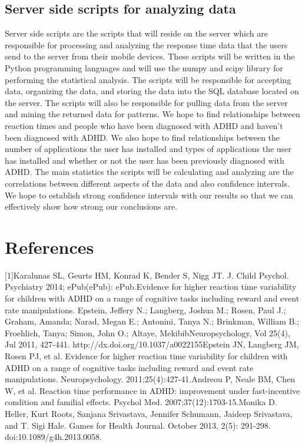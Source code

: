 \documentclass[a4wide]{article}
\begin{document}
\subsection{Server side scripts for analyzing data}
\- Server side scripts are the scripts that will reside on the server which are responsible for processing and analyzing the response time data that the users send to the server from their mobile devices. These scripts will be written in the Python programming languages and will use the numpy and scipy library for performing the statistical analysis. The scripts will be responsible for accepting data, organizing the data, and storing the data into the SQL database located on the server. The scripts will also be responsible for pulling data from the server and mining the returned data for patterns. We hope to find relationships between reaction times and people who have been diagnosed with ADHD and haven't been diagnosed with ADHD. We also hope to find relationships between the number of applications the user has installed and types of applications the user has installed and whether or not the user has been previously diagnosed with ADHD. The main statistics the scripts will be calculating and analyzing are the correlations between different aspects of the data and also confidence intervals. We hope to establish strong confidence intervals with our results so that we can effectively show how strong our conclusions are.

\section{References}
[1]Karalunas SL, Geurts HM, Konrad K, Bender S, Nigg JT. J. Child Psychol. Psychiatry 2014; ePub(ePub): ePub.\newline
[2]Evidence for higher reaction time variability for children with ADHD on a range of cognitive tasks including reward and event rate manipulations. Epstein, Jeffery N.; Langberg, Joshua M.; Rosen, Paul J.; Graham, Amanda; Narad, Megan E.; Antonini, Tanya N.; Brinkman, William B.; Froehlich, Tanya; Simon, John O.; Altaye, MekibibNeuropsychology, Vol 25(4), Jul 2011, 427-441. http://dx.doi.org/10.1037/a0022155\newline
[3] Epstein JN, Langberg JM, Rosen PJ, et al. Evidence for higher reaction time variability for children with ADHD on a range of cognitive tasks including reward and event rate manipulations. Neuropsychology. 2011;25(4):427-41.\newline
[4] Andreou P, Neale BM, Chen W, et al. Reaction time performance in ADHD: improvement under fast-incentive condition and familial effects. Psychol Med. 2007;37(12):1703-15.\newline
[5] Monika D. Heller, Kurt Roots, Sanjana Srivastava, Jennifer Schumann, Jaideep Srivastava, and T. Sigi Hale. Games for Health Journal. October 2013, 2(5): 291-298. doi:10.1089/g4h.2013.0058.\newline
\end{document}
